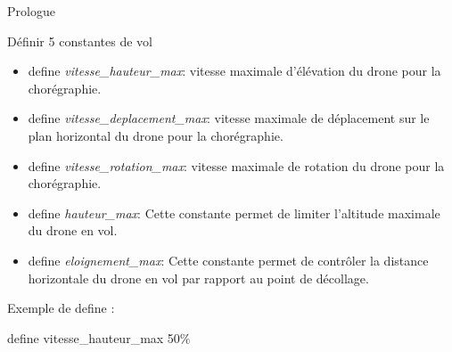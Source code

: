 \documentclass{bredelebeamer}
\begin{document}
\begin{frame}[fragile]{Prologue}
\begin{block}{Définir 5 constantes de vol}
\begin{itemize}
\item \alert{define} \emph{vitesse\_hauteur\_max}: vitesse maximale d’élévation du drone pour la chorégraphie.
\item \alert{define} \emph{vitesse\_deplacement\_max}: vitesse maximale de déplacement sur le plan horizontal du drone pour la chorégraphie. 
\item \alert{define} \emph{vitesse\_rotation\_max}: vitesse maximale de rotation du drone pour la chorégraphie.
\item \alert{define} \emph{hauteur\_max}: Cette constante permet de limiter l’altitude maximale du drone en vol.
\item \alert{define} \emph{eloignement\_max}: Cette constante permet de contr\^oler la distance horizontale du drone en vol par rapport au point de décollage.
\end{itemize}
\end{block}


Exemple de define : 
\begin{center}
\color{Framarouge}
	define vitesse\_hauteur\_max \color{Framagris}50\%
\end{center}
\end{frame} 
\end{document}
